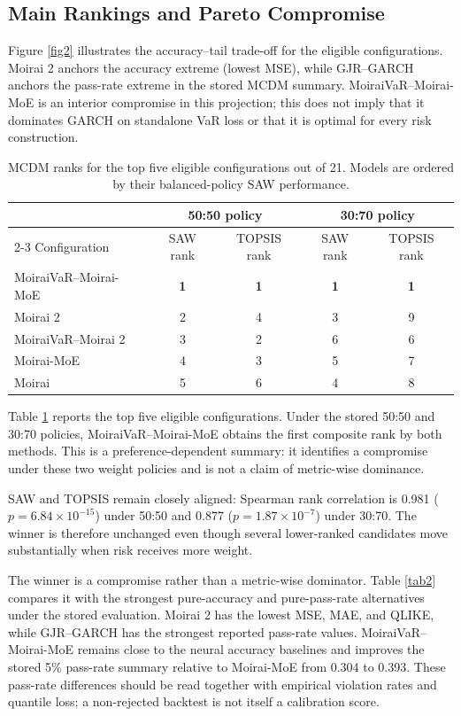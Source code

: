\documentclass[runningheads]{llncs}
\begin{document}
\subsection{Main Rankings and Pareto Compromise}
Figure \ref{fig2} illustrates the accuracy--tail trade-off for the eligible configurations. Moirai 2 anchors the accuracy extreme (lowest MSE), while GJR--GARCH anchors the pass-rate extreme in the stored MCDM summary. MoiraiVaR--Moirai-MoE is an interior compromise in this projection; this does not imply that it dominates GARCH on standalone VaR loss or that it is optimal for every risk construction.

\begin{table}[h]
\centering
\caption{MCDM ranks for the top five eligible configurations out of 21. Models are ordered by their balanced-policy SAW performance.}\label{tab1}
\begin{tabular}{lcccc}
\hline
& \multicolumn{2}{c}{50:50 policy} & \multicolumn{2}{c}{30:70 policy} \\
\cline{2-3} \cline{4-5}
Configuration & SAW rank & TOPSIS rank & SAW rank & TOPSIS rank \\
\hline
MoiraiVaR--Moirai-MoE & \textbf{1} & \textbf{1} & \textbf{1} & \textbf{1} \\
Moirai 2 & 2 & 4 & 3 & 9 \\
MoiraiVaR--Moirai 2 & 3 & 2 & 6 & 6 \\
Moirai-MoE & 4 & 3 & 5 & 7 \\
Moirai & 5 & 6 & 4 & 8 \\
\hline
\end{tabular}
\end{table}

Table \ref{tab1} reports the top five eligible configurations. Under the stored 50:50 and 30:70 policies, MoiraiVaR--Moirai-MoE obtains the first composite rank by both methods. This is a preference-dependent summary: it identifies a compromise under these two weight policies and is not a claim of metric-wise dominance.

SAW and TOPSIS remain closely aligned: Spearman rank correlation is 0.981 ($p = 6.84 \times 10^{-15}$) under 50:50 and 0.877 ($p = 1.87 \times 10^{-7}$) under 30:70. The winner is therefore unchanged even though several lower-ranked candidates move substantially when risk receives more weight.

The winner is a compromise rather than a metric-wise dominator. Table \ref{tab2} compares it with the strongest pure-accuracy and pure-pass-rate alternatives under the stored evaluation. Moirai 2 has the lowest MSE, MAE, and QLIKE, while GJR--GARCH has the strongest reported pass-rate values. MoiraiVaR--Moirai-MoE remains close to the neural accuracy baselines and improves the stored 5\% pass-rate summary relative to Moirai-MoE from 0.304 to 0.393. These pass-rate differences should be read together with empirical violation rates and quantile loss; a non-rejected backtest is not itself a calibration score.
\end{document}
